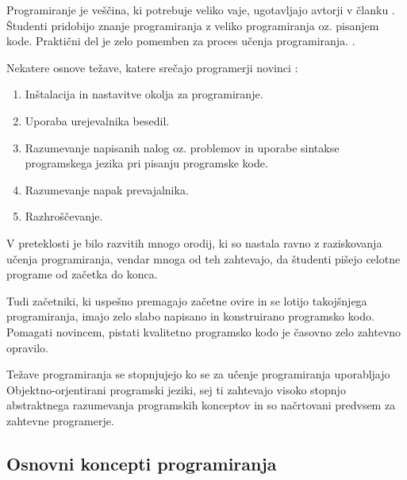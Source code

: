 

Programiranje je veščina, ki potrebuje veliko vaje, ugotavljajo
avtorji v članku \cite{ITaLCP_DistanceEdu}. Študenti pridobijo znanje
programiranja z veliko programiranja oz. pisanjem kode. Praktični del je
zelo pomemben za proces učenja programiranja.
\cite{ITaLCP_DistanceEdu}.

Nekatere osnove težave, katere srečajo programerji novinci \cite{thesisAWebP}:
\begin{enumerate}
\item
  Inštalacija in nastavitve okolja za programiranje.
\item
  Uporaba urejevalnika besedil.
\item Razumevanje napisanih nalog oz. problemov in uporabe sintakse
  programskega jezika pri pisanju programske kode.
\item
  Razumevanje napak prevajalnika.
\item
  Razhroščevanje.
\end{enumerate}

V preteklosti je bilo razvitih mnogo orodij, ki so nastala ravno z
raziskovanja učenja programiranja, vendar mnoga od teh zahtevajo, da
študenti pišejo celotne programe od začetka do konca.

Tudi začetniki, ki uspešno premagajo začetne ovire in se lotijo
takojšnjega programiranja, imajo zelo slabo napisano in konstruirano
programsko kodo. Pomagati novincem, pistati kvalitetno programsko kodo
je časovno zelo zahtevno opravilo.

Težave programiranja se stopnjujejo ko se za učenje programiranja
uporabljajo Objektno-orjentirani programski jeziki, sej ti zahtevajo
visoko stopnjo abstraktnega razumevanja programskih konceptov in so
načrtovani predvsem za zahtevne programerje.


\subsection{Osnovni koncepti programiranja}
\label{sec:Osnvni koncepti_programiranja}

